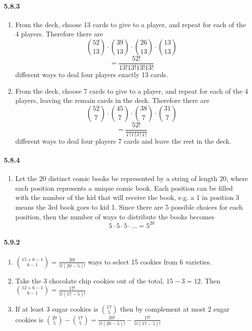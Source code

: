 \documentclass[11pt, letterpaper, twocolumn, fleqn]{article}
\begin{document}
\paragraph{5.8.3}
\begin{enumerate}
  \item From the deck, choose 13 cards to give to a player, and repeat for each of the 4 players. Therefore there are 
    $$\binom{52}{13} \cdot \binom{39}{13} \cdot \binom{26}{13} \cdot \binom{13}{13}$$
    $$= \frac{52!}{13!13!13!13!}$$
  different ways to deal four players exactly 13 cards.
  \item From the deck, choose 7 cards to give to a player, and repeat for each of the 4 players, leaving the remain cards in the deck. Therefore there are 
    $$\binom{52}{7} \cdot \binom{45}{7} \cdot \binom{38}{7} \cdot \binom{31}{7}$$
    $$= \frac{52!}{7!7!7!7!}$$
  different ways to deal four players 7 cards and leave the rest in the deck.
\end{enumerate}

\paragraph{5.8.4}
\begin{enumerate}
  \item Let the 20 distinct comic books be represented by a string of length 20, where each position represents a unique comic book. Each position can be filled with the number of the kid that will receive the book, e.g. a 1 in position 3 means the 3rd book goes to kid 1. Since there are 5 possible choices for each position, then the number of ways to distribute the books becomes
    $$5 \cdot 5 \cdot 5 \cdot ... = 5^{20}$$
\end{enumerate}

\paragraph{5.9.2}
\begin{enumerate}
  \item $\binom{15+6-1}{6-1} = \frac{20!}{5!(20-5)!}$ ways to select 15 cookies from 6 varieties.
  \item Take the 3 chocolate chip cookies out of the total, $15-3=12$. Then $\binom{12+6-1}{6-1} = \frac{17!}{5!(17-5)!}$
  \item If at least 3 sugar cookies is $\binom{17}{5}$ then by complement at most 2 sugar cookies is $\binom{20}{5} - \binom{17}{5} = \frac{20!}{5!(20-5)!} - \frac{17!}{5!(17-5)!}$
\end{enumerate}
\end{document}
